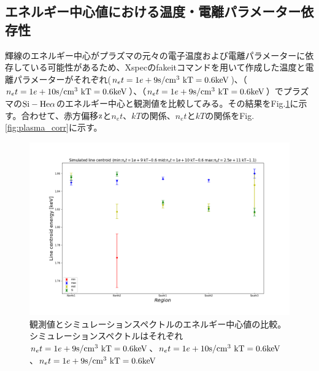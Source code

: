 \documentclass[a4j]{jarticle}%
\begin{document}
\subsection{エネルギー中心値における温度・電離パラメーター依存性}
輝線のエネルギー中心がプラズマの元々の電子温度および電離パラメーターに依存している可能性があるため、Xspecのfakeitコマンドを用いて作成した温度と電離パラメーターがそれぞれ($n_e t =1e+9 \rm{s/cm^3}~kT=0.6 \rm{keV}$)、（$n_e t =1e+10 \rm{s/cm^3}~kT=0.6 \rm{keV}$）、（$n_e t =1e+9 \rm{s/cm^3}~kT=0.6 \rm{keV}$）でプラズマの$\rm{Si-He\alpha}$のエネルギー中心と観測値を比較してみる。その結果をFig.\ref{fig:centroid-simulation}に示す。合わせて、赤方偏移$\rm{z}$と$n_e t$、$kT$の関係、$n_e t$と$kT$の関係をFig.\ref{fig:plasma_corr}に示す。
\begin{figure}[H]
  \begin{center}
  \includegraphics[scale=0.4]{./simulated_centroid_energy_vs_measured.png}
  \caption{観測値とシミュレーションスペクトルのエネルギー中心値の比較。シミュレーションスペクトルはそれぞれ$n_e t =1e+9 \rm{s/cm^3}~kT=0.6 \rm{keV}$、$n_e t =1e+10 \rm{s/cm^3}~kT=0.6 \rm{keV}$、$n_e t =1e+9 \rm{s/cm^3}~kT=0.6 \rm{keV}$}
  \label{fig:centroid-simulation}
  \end{center}
  \end{figure}
\end{document}
